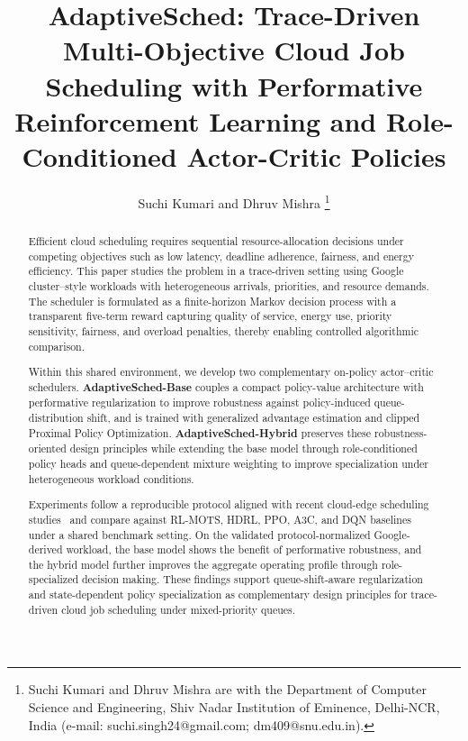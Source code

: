 \documentclass[journal]{IEEEtran}
\begin{document}
\title{AdaptiveSched: Trace-Driven Multi-Objective Cloud Job Scheduling with Performative Reinforcement Learning and Role-Conditioned Actor-Critic Policies}

\author{Suchi Kumari and Dhruv Mishra%
\thanks{Suchi Kumari and Dhruv Mishra are with the Department of Computer Science and Engineering, Shiv Nadar Institution of Eminence, Delhi-NCR, India (e-mail: suchi.singh24@gmail.com; dm409@snu.edu.in).}}

\maketitle

\begin{abstract}
Efficient cloud scheduling requires sequential resource-allocation decisions under competing objectives such as low latency, deadline adherence, fairness, and energy efficiency. This paper studies the problem in a trace-driven setting using Google cluster--style workloads with heterogeneous arrivals, priorities, and resource demands. The scheduler is formulated as a finite-horizon Markov decision process with a transparent five-term reward capturing quality of service, energy use, priority sensitivity, fairness, and overload penalties, thereby enabling controlled algorithmic comparison.

Within this shared environment, we develop two complementary on-policy actor--critic schedulers. \textbf{AdaptiveSched-Base} couples a compact policy-value architecture with performative regularization to improve robustness against policy-induced queue-distribution shift, and is trained with generalized advantage estimation and clipped Proximal Policy Optimization. \textbf{AdaptiveSched-Hybrid} preserves these robustness-oriented design principles while extending the base model through role-conditioned policy heads and queue-dependent mixture weighting to improve specialization under heterogeneous workload conditions.

Experiments follow a reproducible protocol aligned with recent cloud-edge scheduling studies~\cite{zhang2025s41598} and compare against RL-MOTS, HDRL, PPO, A3C, and DQN baselines under a shared benchmark setting. On the validated protocol-normalized Google-derived workload, the base model shows the benefit of performative robustness, and the hybrid model further improves the aggregate operating profile through role-specialized decision making. These findings support queue-shift-aware regularization and state-dependent policy specialization as complementary design principles for trace-driven cloud job scheduling under mixed-priority queues.
\end{abstract}
\end{document}
